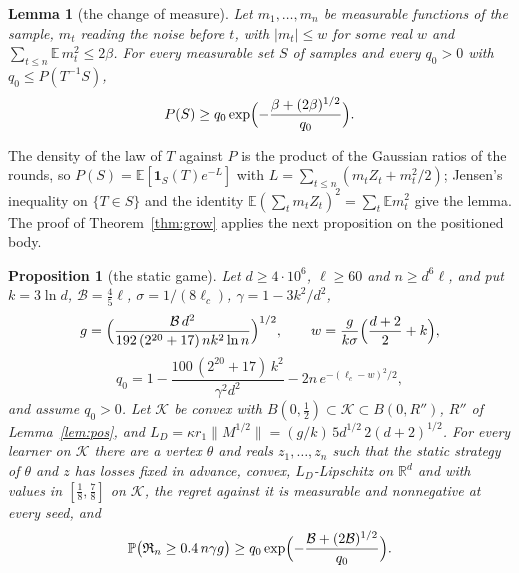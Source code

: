 \documentclass[11pt]{amsart}
\newtheorem{lemma}[theorem]{Lemma}
\newtheorem{proposition}[theorem]{Proposition}
\theoremstyle{definition}
\numberwithin{equation}{section}
\newcommand{\R}{\mathbb{R}}
\newcommand{\E}{\mathbb{E}}
\newcommand{\Prob}{\mathbb{P}}
\newcommand{\cK}{\mathcal{K}}
\newcommand{\Reg}{\mathfrak{R}}
\begin{document}
\begin{lemma}[the change of measure]\label{lem:shift}
Let $m_1,\dots,m_n$ be measurable functions of the sample, $m_t$ reading the noise before $t$, with $|m_t|\le w$ for some real $w$ and $\sum_{t\le n}\E\,m_t^2\le2\beta$. For every measurable set $S$ of samples and every $q_0>0$ with $q_0\le P(T^{-1}S)$,
\[
P(S)\ge q_0\exp\Bigl(-\frac{\beta+(2\beta)^{1/2}}{q_0}\Bigr).
\]
\end{lemma}

The density of the law of $T$ against $P$ is the product of the Gaussian ratios of the rounds, so $P(S)=\E[\mathbf 1_S(T)e^{-L}]$ with $L=\sum_{t\le n}(m_tZ_t+m_t^2/2)$; Jensen's inequality on $\{T\in S\}$ and the identity $\E(\sum_tm_tZ_t)^2=\sum_t\E m_t^2$ give the lemma.
The proof of Theorem~\ref{thm:grow} applies the next proposition on the positioned body.

\begin{proposition}[the static game]\label{prop:static}
Let $d\ge4\cdot10^6$, $\ell\ge60$ and $n\ge d^6\ell$, and put $k=3\ln d$, $\mathcal B=\frac45\ell$, $\sigma=1/(8\ell_c)$, $\gamma=1-3k^2/d^2$,
\[
g=\Bigl(\frac{\mathcal B\,d^2}{192\,(2^{20}+17)\,nk^2\ln n}\Bigr)^{1/2},\qquad w=\frac{g}{k\sigma}\Bigl(\frac{d+2}2+k\Bigr),
\]
\[
q_0=1-\frac{100\,(2^{20}+17)\,k^2}{\gamma^2d^2}-2n\,e^{-(\ell_c-w)^2/2},
\]
and assume $q_0>0$. Let $\cK$ be convex with $B(0,\frac12)\subset\cK\subset B(0,R'')$, $R''$ of Lemma~\ref{lem:pos}, and $L_D=\kappa r_1\|M^{1/2}\|=(g/k)\,5d^{1/2}\,2(d+2)^{1/2}$. For every learner on $\cK$ there are a vertex $\theta$ and reals $z_1,\dots,z_n$ such that the static strategy of $\theta$ and $z$ has losses fixed in advance, convex, $L_D$-Lipschitz on $\R^d$ and with values in $[\frac18,\frac78]$ on $\cK$, the regret against it is measurable and nonnegative at every seed, and
\[
\Prob\bigl(\Reg_n\ge0.4\,n\gamma g\bigr)\ge q_0\exp\Bigl(-\frac{\mathcal B+(2\mathcal B)^{1/2}}{q_0}\Bigr).
\]
\end{proposition}
\end{document}
